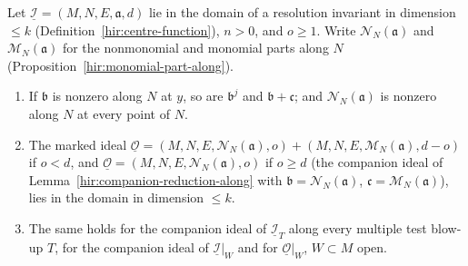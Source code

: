 \begin{proposition}
\label{bcalc:companion-domain}
\leanok
Let \(\underline{\mathcal I}=(M,N,E,\mathfrak a,d)\) lie in the domain of a resolution invariant in dimension \(\le k\) (Definition~\ref{hir:centre-function}), \(n>0\), and
\(o\ge1\). Write \(\mathcal N_N(\mathfrak a)\) and \(\mathcal M_N(\mathfrak a)\) for the nonmonomial and monomial parts along \(N\) (Proposition~\ref{hir:monomial-part-along}).
\begin{enumerate}
\item If \(\mathfrak b\) is nonzero along \(N\) at \(y\), so are \(\mathfrak b^j\) and \(\mathfrak b+\mathfrak c\); and \(\mathcal N_N(\mathfrak a)\) is nonzero along \(N\) at every point
of \(N\).
\item The marked ideal \(\underline{\mathcal O}=(M,N,E,\mathcal N_N(\mathfrak a),o)+(M,N,E,\mathcal M_N(\mathfrak a),d-o)\) if \(o<d\), and
\(\underline{\mathcal O}=(M,N,E,\mathcal N_N(\mathfrak a),o)\) if \(o\ge d\) (the companion ideal of Lemma~\ref{hir:companion-reduction-along} with
\(\mathfrak b=\mathcal N_N(\mathfrak a)\), \(\mathfrak c=\mathcal M_N(\mathfrak a)\)), lies in the domain in dimension \(\le k\).
\item The same holds for the companion ideal of \(\underline{\mathcal I}_T\) along every multiple test blow-up \(T\), for the companion ideal of \(\underline{\mathcal I}|_W\)
and for \(\underline{\mathcal O}|_W\), \(W\subset M\) open.
\end{enumerate}
\end{proposition}
